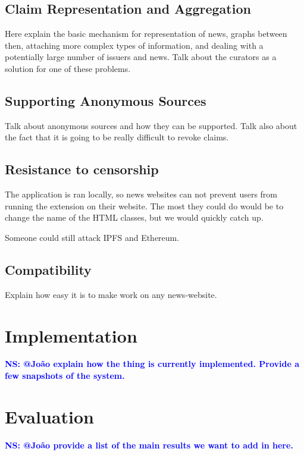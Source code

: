 \documentclass[letterpaper,twocolumn,10pt]{article}
\newcommand{\note}[1]{\textcolor{blue}{\bf #1}}
\begin{document}
\subsection{Claim Representation and Aggregation}

Here explain the basic mechanism for representation of news, graphs between then, attaching more complex types of information, and dealing with a potentially large number of issuers and news. Talk about the curators as a solution for one of these problems.


\subsection{Supporting Anonymous Sources}

Talk about anonymous sources and how they can be supported. Talk also about the fact that it is going to be really difficult to revoke claims.

\subsection{Resistance to censorship}
The application is ran locally, so news websites can not prevent users from running the extension on their website. The most they could do would be to change the name of the HTML classes, but we would quickly catch up.

Someone could still attack IPFS and Ethereum.

\subsection{Compatibility}
Explain how easy it is to make work on any news-website.

\section{Implementation}

\note{NS: @João explain how the thing is currently implemented. Provide a few snapshots of the system.}


\section{Evaluation}

\note{NS: @João provide a list of the main results we want to add in here.}
\end{document}
